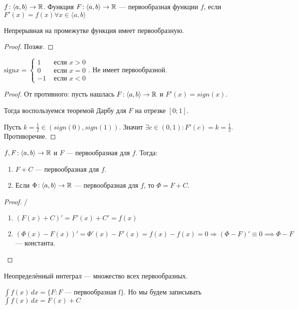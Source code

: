 \begin{definition}
    $f\!: \langle a, b \rangle \to \mathbb{R}$. Функция  $F\!: \langle a, b \rangle \to \mathbb{R}$ --- первообразная функции  $f$, если  $F'(x) = f(x) \forall x \in \langle a, b \rangle$
\end{definition}
\begin{theorem}
    Непрерывная на промежутке функция имеет первообразную.
\end{theorem}
\begin{proof}
    Позже.
\end{proof}
\begin{remark}
    $\text{sign} x = \begin{cases} 1 & \text{ если } x > 0 \\ 0 & \text{ если } x = 0 \\ -1 & \text{ если }  x < 0 \end{cases}$. Не имеет первообразной.
\end{remark}
\begin{proof}
    От противного: пусть нашлась $F\!: \langle a, b \rangle \to \mathbb{R}$ и $F'(x) = sign(x)$.
    
    Тогда воспользуемся теоремой Дарбу для $F$ на отрезке $[0; 1]$.
    
    Пусть $k = \frac{1}{2} \in (sign(0), sign(1))$. Значит $\exists c \in (0, 1) \!: F'(c) = k = \frac{1}{2}$. Противоречие.
\end{proof}
\begin{theorem}
    $f, F\!: \langle a, b \rangle \to \mathbb{R}$ и  $F$ --- первообразная для  $f$. Тогда: 
     \begin{enumerate}
         \item $F+C$ --- первообразная для  $f$.
         \item  Если  $\Phi\!: \langle a, b \rangle \to \mathbb{R}$ --- первообразная для  $f$, то  $\Phi = F + C$. 
    \end{enumerate}
\end{theorem}
\begin{proof}
    \slash
    \begin{enumerate}
        \item $(F(x) + C)' = F'(x) + C' = f(x)$
        \item $(\Phi(x) - F(x))' = \Phi'(x) - F'(x) = f(x) - f(x) = 0 \Rightarrow (\Phi - F)' \equiv 0 \implies \Phi -F$ --- константа. 
    \end{enumerate}
\end{proof}
\begin{definition}
    Неопределённый интеграл --- множество всех первообразных.

    $\int f(x)\,dx = \{F\!: F \text{ --- первообразная f}\}$. Но мы будем записывать $\int f(x)\,dx = F(x) + C$
\end{definition}


